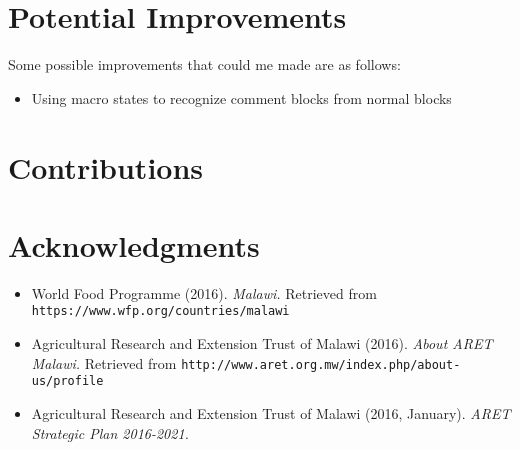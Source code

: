 \documentclass[12pt,letterpaper]{article}
\begin{document}
\section{Potential Improvements}
Some possible improvements that could me made are as follows:
\begin{itemize}
\item Using macro states to recognize comment blocks from normal blocks

\end{itemize}

\section{Contributions}


\clearpage
\section{Acknowledgments}
\begin{flushleft}
\begin{itemize}[leftmargin=12pt]

\item World Food Programme (2016). \emph{Malawi.}
 Retrieved from \texttt{https://www.wfp.org/countries/malawi}

\item Agricultural Research and Extension Trust of Malawi (2016). \emph{About ARET Malawi.}
Retrieved from \texttt{http://www.aret.org.mw/index.php/about-us/profile}

\item Agricultural Research and Extension Trust of Malawi (2016, January). \emph{ARET Strategic Plan 2016-2021.}


\end{itemize}
\end{flushleft}   
\end{document}
